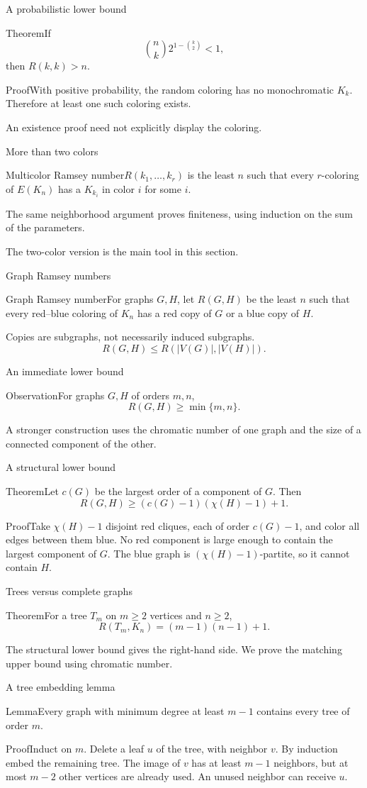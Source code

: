 \documentclass[aspectratio=169,11pt]{beamer}
\newcommand{\Def}[2]{\begin{block}{#1}#2\end{block}}
\newcommand{\Thm}[2]{\begin{block}{#1}#2\end{block}}
\renewcommand{\Proof}[1]{\begin{block}{Proof}\normalsize #1\end{block}}
\newcommand{\gap}{\par\medskip}
\begin{document}
\begin{frame}{A probabilistic lower bound}
\large
\Thm{Theorem}{If
\[\binom nk2^{1-\binom{k}{2}}<1,\]
then $R(k,k)>n$.}
\Proof{With positive probability, the random coloring has no monochromatic $K_k$. Therefore at least one such coloring exists.}
\gap An existence proof need not explicitly display the coloring.
\end{frame}
\begin{frame}{More than two colors}
\large
\Def{Multicolor Ramsey number}{$R(k_1,\ldots,k_r)$ is the least $n$ such that every $r$-coloring of $E(K_n)$ has a $K_{k_i}$ in color $i$ for some $i$.}
\gap The same neighborhood argument proves finiteness, using induction on the sum of the parameters.
\gap The two-color version is the main tool in this section.
\end{frame}
\begin{frame}{Graph Ramsey numbers}
\large
\Def{Graph Ramsey number}{For graphs $G,H$, let $R(G,H)$ be the least $n$ such that every red--blue coloring of $K_n$ has a red copy of $G$ or a blue copy of $H$.}
\gap Copies are subgraphs, not necessarily induced subgraphs.
\[R(G,H)\leq R(|V(G)|,|V(H)|).\]
\end{frame}
\begin{frame}{An immediate lower bound}
\large
\Thm{Observation}{For graphs $G,H$ of orders $m,n$,
\[R(G,H)\geq\min\{m,n\}.\]}
\gap A stronger construction uses the chromatic number of one graph and the size of a connected component of the other.
\end{frame}
\begin{frame}{A structural lower bound}
\large
\Thm{Theorem}{Let $c(G)$ be the largest order of a component of $G$. Then
\[R(G,H)\geq(c(G)-1)(\chi(H)-1)+1.\]}
\Proof{Take $\chi(H)-1$ disjoint red cliques, each of order $c(G)-1$, and color all edges between them blue. No red component is large enough to contain the largest component of $G$. The blue graph is $(\chi(H)-1)$-partite, so it cannot contain $H$.}
\end{frame}
\begin{frame}{Trees versus complete graphs}
\large
\Thm{Theorem}{For a tree $T_m$ on $m\geq2$ vertices and $n\geq2$,
\[R(T_m,K_n)=(m-1)(n-1)+1.\]}
\gap The structural lower bound gives the right-hand side. We prove the matching upper bound using chromatic number.
\end{frame}
\begin{frame}{A tree embedding lemma}
\large
\Thm{Lemma}{Every graph with minimum degree at least $m-1$ contains every tree of order $m$.}
\Proof{Induct on $m$. Delete a leaf $u$ of the tree, with neighbor $v$. By induction embed the remaining tree. The image of $v$ has at least $m-1$ neighbors, but at most $m-2$ other vertices are already used. An unused neighbor can receive $u$.}
\end{frame}
\end{document}

